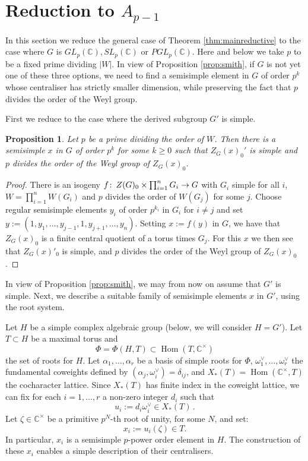 \documentclass[oneside, 12pt, a4paper]{amsart}
\numberwithin{equation}{section}
\newcommand{\C}{\mathbb{C}}
\newcommand{\Hom}{\operatorname{Hom}}
\newcommand{\co}{\colon\thinspace}
\theoremstyle{plain}
\newtheorem{proposition}[theorem]{Proposition}
\theoremstyle{definition}
\theoremstyle{remark}
\begin{document}
\section{Reduction to $A_{p-1}$} \label{sec:reduction}

In this section we reduce the general case of Theorem \ref{thm:mainreductive} to the case where $G$ is $GL_p(\C),SL_p(\C)$ or $PGL_p(\C)$. Here and below we take $p$ to be a fixed prime dividing $|W|$. In view of Proposition \ref{prop:smith}, if $G$ is not yet one of these three options, we need to find a semisimple element in $G$ of order $p^k$ whose centraliser has strictly smaller dimension, while preserving the fact that $p$ divides the order of the Weyl group.

First we reduce to the case where the derived subgroup $G'$ is simple.

\begin{proposition} \label{prop:simple}
Let $p$ be a prime dividing the order of $W$. Then there is a semisimple $x$ in $G$ of order $p^k$ for some $k\geq 0$ such that $Z_G(x)_0'$ is simple and $p$ divides the order of the Weyl group of $Z_G(x)_0$.
\end{proposition}

\begin{proof}
There is an isogeny $f\co Z(G)_0\times \prod_{i=1}^n G_i\to G$ with $G_i$ simple for all $i$, $W=\prod_{i=1}^n W(G_i)$ and $p$ divides the order of $W(G_j)$ for some $j$. Choose regular semisimple elements $y_i$ of order $p^{k_i}$ in $G_i$ for $i\neq j$ and set $y:=(1,y_1,\dots,y_{j-1},1,y_{j+1},\dots,y_n)$. Setting $x:=f(y)$ in $G$, we have that $Z_G(x)_0$ is a finite central quotient of a torus times $G_j$. For this $x$ we then see that $Z_G(x)'_0$ is simple, and $p$ divides the order of the Weyl group of $Z_G(x)_0$.
\end{proof}

In view of Proposition \ref{prop:smith}, we may from now on assume that $G'$ is simple. Next, we describe a suitable family of semisimple elements $x$ in $G'$, using the root system.

Let $H$ be a simple complex algebraic group (below, we will consider $H=G'$). Let $T\subset H$ be a maximal torus and
\[
\Phi=\Phi(H,T)\subset \Hom(T,\C^\times)
\]
the set of roots for $H$. Let $\alpha_1,\dots,\alpha_r$ be a basis of simple roots for $\Phi$, $\omega_1^\vee,\dots,\omega_r^\vee$ the fundamental coweights defined by $(\alpha_j,\omega_i^\vee)=\delta_{ij}$, and $X_\ast(T)=\Hom(\C^\times,T)$ the cocharacter lattice. Since $X_\ast(T)$ has finite index in the coweight lattice, we can fix for each $i=1,\dots,r$ a non-zero integer $d_i$ such that
\[
u_i:=d_i \omega_i^\vee\in X_\ast(T)\,.
\]
Let $\zeta\in \C^\times$ be a primitive $p^N$-th root of unity, for some $N$, and set: \[x_i:=u_i(\zeta)\in T.\]
In particular, $x_i$ is a semisimple $p$-power order element in $H$. The construction of these $x_i$ enables a simple description of their centralisers.
\end{document}
